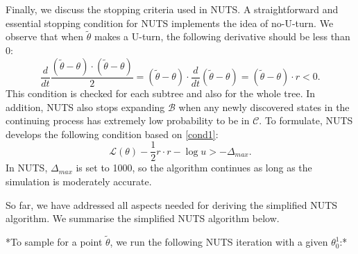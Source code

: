 \documentclass{article}
\begin{document}
\par Finally, we discuss the stopping criteria used in NUTS. A straightforward and essential stopping condition for NUTS implements the idea of no-U-turn. We observe that when $\tilde{\theta}$ makes a U-turn, the following derivative
should be less than 0:
\begin{equation}
\frac{d}{dt}\frac{(\tilde{\theta}-\theta)\cdot (\tilde{\theta}-\theta)}{2} = (\tilde{\theta}-\theta)\cdot\frac{d}{dt}(\tilde{\theta}-\theta)= (\tilde{\theta}-\theta)\cdot r < 0.
\label{cond2} \tag{C.2}
\end{equation}
%
This condition is checked for each subtree and also for the whole tree. %
In addition, NUTS also stops expanding $\mathcal{B}$ when any newly discovered states in the continuing process has extremely low probability to be in $\mathcal{C}$. To formulate, NUTS develops the following condition based on \eqref{cond1}:
\begin{equation}
\mathcal{L}(\theta) -\frac{1}{2}r\cdot r -\log u > -\Delta_{max}.
\label{cond3} \tag{C.3}
\end{equation}
\noindent In NUTS, $\Delta_{max}$ is set to 1000, so the algorithm continues as long as the simulation is moderately accurate.

So far, we have addressed all aspects needed for deriving the simplified NUTS algorithm. We summarise the simplified NUTS algorithm below.

*To sample for a point $\tilde{\theta}$, we run the following NUTS iteration with a given $\theta_0^1$:*
\end{document}
